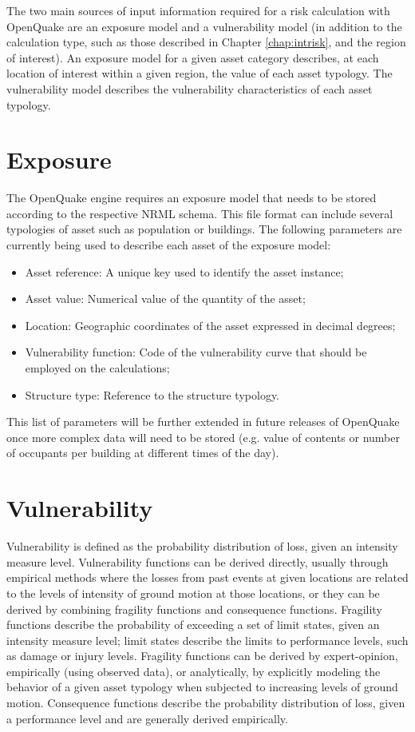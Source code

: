 The two main sources of input information required for a risk calculation with OpenQuake are an exposure model and a vulnerability model (in addition to the calculation type, such as those described in Chapter \ref{chap:intrisk}, and the region of interest). An exposure model for a given asset category describes, at each location of interest within a given region, the value of each asset typology. The vulnerability model describes the vulnerability characteristics of each asset typology.
\section{Exposure}
The OpenQuake engine requires an exposure model that needs to be stored according to the respective NRML schema. This file format can include several typologies of asset such as population or buildings. The following parameters are currently being used to describe each asset of the exposure model: 

\begin{itemize}
\item Asset reference: A unique key used to identify the asset instance;
\item Asset value: Numerical value of the quantity of the asset;
\item Location: Geographic coordinates of the asset expressed in decimal degrees;
\item Vulnerability function: Code of the vulnerability curve that should be employed on the calculations;
\item Structure type: Reference to the structure typology.
\end{itemize}

This list of parameters will be further extended in future releases of OpenQuake once more complex data will need to be stored (e.g. value of contents or number of occupants per building at different times of the day).  

\section{Vulnerability}
Vulnerability is defined as the probability distribution of loss, given an intensity measure level. Vulnerability functions can be derived directly, usually through empirical methods where the losses from past events at given locations are related to the levels of intensity of ground motion at those locations, or they can be derived by combining fragility functions and consequence functions. Fragility functions describe the probability of exceeding a set of limit states, given an intensity measure level; limit states describe the limits to performance levels, such as damage or injury levels. Fragility functions can be derived by expert-opinion, empirically (using observed data), or analytically, by explicitly modeling the behavior of a given asset typology when subjected to increasing levels of ground motion. Consequence functions describe the probability distribution of loss, given a performance level and are generally derived empirically. 

